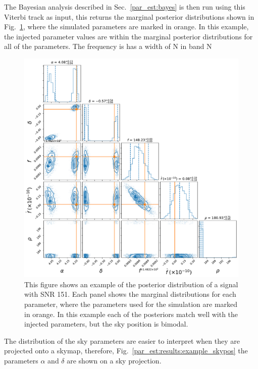 The Bayesian analysis described in Sec.~\ref{par_est:bayes} is then run using this Viterbi track as input, this returns the marginal posterior distributions shown in Fig.~\ref{par_est:results:example_posterior}, where the simulated parameters are marked in orange.
In this example, the injected parameter values are within the marginal posterior distributions for all of the parameters.
The frequency is has a width of N in band N 
%
\begin{figure}[pt]

    \centering
    \includegraphics[width=\linewidth]{C5_parameter/cornerplot.pdf}
    \caption[KDE of likelihood in different \gls{SNR} ranges]{This figure shows an example of the posterior distribution of a signal with \gls{SNR} 151. Each panel shows the marginal distributions for each parameter, where the parameters used for the simulation are marked in orange. In this example each of the posteriors match well with the injected parameters, but the sky position is bimodal. }
    \label{par_est:results:example_posterior}
    
\end{figure}
%
The distribution of the sky parameters are easier to interpret when they are projected onto a skymap, therefore, Fig.~\ref{par_est:results:example_skypos} the parameters $\alpha$ and $\delta$ are shown on a sky projection.
